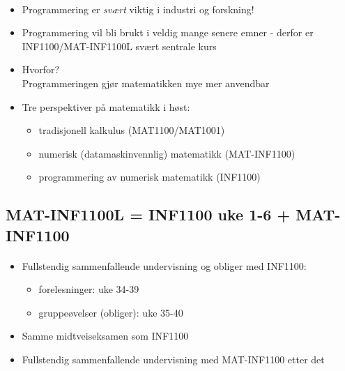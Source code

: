 \documentclass[%
oneside,                 %
final,                   %
10pt]{article}
\begin{document}
\paragraph{}
\begin{itemize}
  \item Programmering er \emph{svært} viktig i industri og forskning!

  \item Programmering vil bli brukt i veldig mange senere emner - derfor er INF1100/MAT-INF1100L svært sentrale kurs

  \item Hvorfor?\\
    Programmeringen gjør matematikken mye mer anvendbar

  \item Tre perspektiver på matematikk i høst:
\begin{itemize}

    \item tradisjonell kalkulus (MAT1100/MAT1001)

    \item numerisk (datamaskinvennlig) matematikk (MAT-INF1100)

    \item programmering av numerisk matematikk (INF1100)
\end{itemize}

\noindent
\end{itemize}

\noindent



\subsection*{MAT-INF1100L = INF1100 uke 1-6 + MAT-INF1100}


\paragraph{}
\begin{itemize}
 \item Fullstendig sammenfallende undervisning og obliger med INF1100:
\begin{itemize}

   \item forelesninger: uke 34-39

   \item gruppeøvelser (obliger): uke 35-40

\end{itemize}

\noindent
 \item Samme midtveiseksamen som INF1100

 \item Fullstendig sammenfallende undervisning med MAT-INF1100 etter det
\end{itemize}
\end{document}
